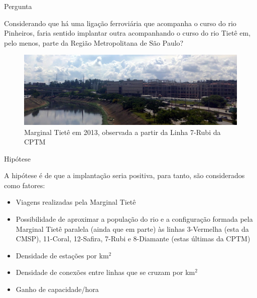 \documentclass[spectratio=43, portuguese]{beamer}
\begin{document}
\begin{frame}{Pergunta}
	
	\begin{block}
		{\large Considerando que há uma ligação ferroviária que acompanha o curso do rio Pinheiros, faria sentido implantar outra acompanhando o curso do rio Tietê em, pelo menos, parte da Região Metropolitana de São Paulo?}
	\end{block}
	
	\begin{figure}
		\centering
		\caption{Marginal Tietê em 2013, observada a partir da Linha 7-Rubi da CPTM}
		\label{fig:mtiete_l7}
		\includegraphics[width=0.8\linewidth]{img/13020087}
	\end{figure}
	
\end{frame}


\begin{frame}{Hipótese}
	
	A hipótese é de que a implantação seria positiva, para tanto, são considerados como fatores:
	
	\begin{itemize}
		\item Viagens realizadas pela Marginal Tietê
		\item Possibilidade de aproximar a população do rio e a configuração formada pela Marginal Tietê paralela (ainda que em parte) às linhas 3-Vermelha (esta da CMSP), 11-Coral, 12-Safira, 7-Rubi e 8-Diamante (estas últimas da CPTM)
		\item Densidade de estações por km$^{2}$
		\item Densidade de conexões entre linhas que se cruzam por km$^{2}$
		\item Ganho de capacidade/hora
	\end{itemize}
	
\end{frame}

\end{document}
